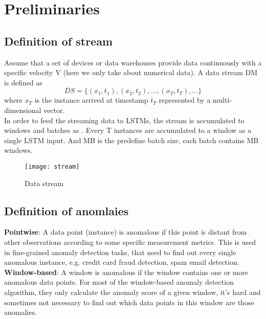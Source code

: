 \chapter{Preliminaries}
\label{chap:Preliminaries}

\section{Definition of stream}
\label{sec:Definition of stream}

Assume that a set of devices or data warehouses provide data continuously with a specific velocity V (here we only take about numerical data). A data stream DM is defined as 
\begin{equation} \label{eq:DS}
DS = \{(x_1,t_1),(x_2,t_2), ... , (x_T,t_T), ...\}
\end{equation}
where \textbf{$x_T$} is the instance arrived at timestamp \textbf{$t_T$} represented by a multi-dimensional vector.\\

In order to feed the streaming data to LSTMs, the stream is accumulated to windows and batches as . Every T instances are accumulated to a window as a single LSTM input. And MB is the predefine batch size, each batch contains MB windows.

\begin{figure}[h]
\centering
\texttt{[image: stream]}
\caption[Data stream]{Data stream}
\label{fig:stream}
\end{figure}




\section{Definition of anomlaies}
\label{sec:Definition of anomalies}

\textbf{Pointwise}: A data point (instance) is anomalous if this point is distant from other observations according to some specific measurement metrics. This is used in fine-grained anomaly detection tasks, that need to find out every single anomalous instance, e.g. credit card fraud detection, spam email detection.\\

\textbf{Window-based}: A window is anomalous if the window contains one or more anomalous data points. For most of the window-based anomaly detection algorithm, they only calculate the anomaly score of a given window, it’s hard and sometimes not necessary to find out which data points in this window are those anomalies.\\

